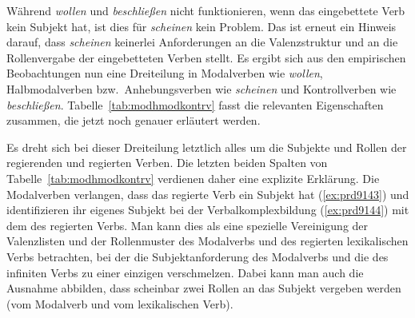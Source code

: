 Während \textit{wollen} und \textit{beschließen} nicht funktionieren, wenn das eingebettete Verb kein Subjekt hat, ist dies für \textit{scheinen} kein Problem.
Das ist erneut ein Hinweis darauf, dass \textit{scheinen} keinerlei Anforderungen an die Valenzstruktur und an die Rollenvergabe der eingebetteten Verben stellt.
Es ergibt sich aus den empirischen Beobachtungen nun eine Dreiteilung in Modalverben wie \textit{wollen}, Halbmodalverben bzw.\ Anhebungsverben wie \textit{scheinen} und Kontrollverben wie \textit{beschließen}.
Tabelle~\ref{tab:modhmodkontrv} fasst die relevanten Eigenschaften zusammen, die jetzt noch genauer erläutert werden.

\begin{table}
  \caption{Modalverben, Halbmodalverben und Kontrollverben}
  \label{tab:modhmodkontrv}
\end{table}



Es dreht sich bei dieser Dreiteilung letztlich alles um die Subjekte und Rollen der regierenden und regierten Verben.
Die letzten beiden Spalten von Tabelle~\ref{tab:modhmodkontrv} verdienen daher eine explizite Erklärung.
Die Modalverben verlangen, dass das regierte Verb ein Subjekt hat (\ref{ex:prd9143}) und identifizieren ihr eigenes Subjekt bei der Verbalkomplexbildung (\ref{ex:prd9144}) mit dem des regierten Verbs.
Man kann dies als eine spezielle Vereinigung der Valenzlisten und der Rollenmuster des Modalverbs und des regierten lexikalischen Verbs betrachten, bei der die Subjektanforderung des Modalverbs und die des infiniten Verbs zu einer einzigen verschmelzen.
Dabei kann man auch die Ausnahme abbilden, dass scheinbar zwei Rollen an das Subjekt vergeben werden (vom Modalverb und vom lexikalischen Verb).

